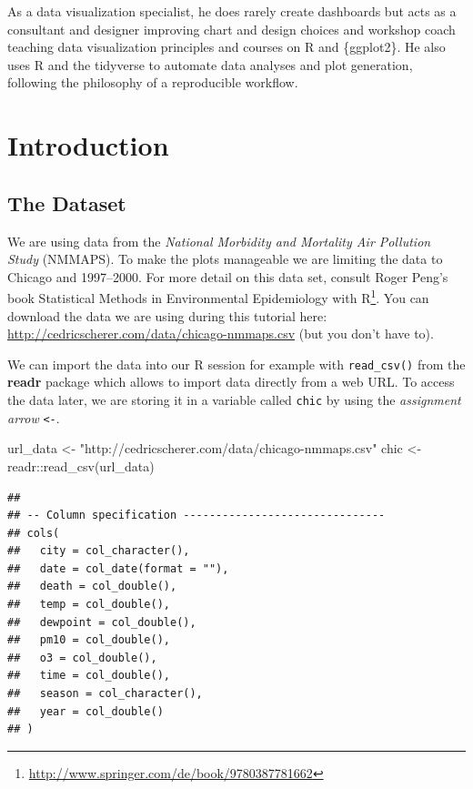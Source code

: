 \documentclass[
]{krantz}
\makeatletter
\newenvironment{Shaded}{\begin{snugshade}}{\end{snugshade}}
\newcommand{\FunctionTok}[1]{\textcolor[rgb]{0,0,0}{#1}}
\newcommand{\NormalTok}[1]{#1}
\newcommand{\OtherTok}[1]{\textcolor[rgb]{0.37,0.37,0.37}{#1}}
\newcommand{\SpecialCharTok}[1]{\textcolor[rgb]{0,0,0}{#1}}
\newcommand{\StringTok}[1]{\textcolor[rgb]{0.5,0.5,0.5}{#1}}
\renewcommand{\href}[2]{#2\footnote{\url{#1}}}
\newenvironment{kframe}{%
\medskip{}
\setlength{\fboxsep}{.8em}
 \def\at@end@of@kframe{}%
 \ifinner\ifhmode%
  \def\at@end@of@kframe{\end{minipage}}%
  \begin{minipage}{\columnwidth}%
 \fi\fi%
 \def\FrameCommand##1{\hskip\@totalleftmargin \hskip-\fboxsep
 \colorbox{shadecolor}{##1}\hskip-\fboxsep
     \hskip-\linewidth \hskip-\@totalleftmargin \hskip\columnwidth}%
 \MakeFramed {\advance\hsize-\width
   \@totalleftmargin\z@ \linewidth\hsize
   \@setminipage}}%
 {\par\unskip\endMakeFramed%
 \at@end@of@kframe}
\renewenvironment{Shaded}{\begin{kframe}}{\end{kframe}}
\makeatother
\begin{document}
As a data visualization specialist, he does rarely create dashboards but acts as a consultant and designer improving chart and design choices and workshop coach teaching data visualization principles and courses on R and \{ggplot2\}. He also uses R and the tidyverse to automate data analyses and plot generation, following the philosophy of a reproducible workflow.

\mainmatter

\hypertarget{introduction}{%
\chapter{Introduction}\label{introduction}}

\hypertarget{data}{%
\section{The Dataset}\label{data}}

We are using data from the \emph{National Morbidity and Mortality Air Pollution Study} (NMMAPS). To make the plots manageable we are limiting the data to Chicago and 1997--2000. For more detail on this data set, consult Roger Peng's book \href{http://www.springer.com/de/book/9780387781662}{Statistical Methods in Environmental Epidemiology with R}.
You can download the data we are using during this tutorial here: \url{http://cedricscherer.com/data/chicago-nmmaps.csv} (but you don't have to).

We can import the data into our R session for example with \texttt{read\_csv()} from the \textbf{readr} package which allows to import data directly from a web URL. To access the data later, we are storing it in a variable called \texttt{chic} by using the \emph{assignment arrow} \texttt{\textless{}-}.

\begin{Shaded}
\begin{Highlighting}[]
\NormalTok{url\_data }\OtherTok{\textless{}{-}} \StringTok{"http://cedricscherer.com/data/chicago{-}nmmaps.csv"}
\NormalTok{chic }\OtherTok{\textless{}{-}}\NormalTok{ readr}\SpecialCharTok{::}\FunctionTok{read\_csv}\NormalTok{(url\_data)}
\end{Highlighting}
\end{Shaded}

\begin{verbatim}
## 
## -- Column specification -------------------------------
## cols(
##   city = col_character(),
##   date = col_date(format = ""),
##   death = col_double(),
##   temp = col_double(),
##   dewpoint = col_double(),
##   pm10 = col_double(),
##   o3 = col_double(),
##   time = col_double(),
##   season = col_character(),
##   year = col_double()
## )
\end{verbatim}
\end{document}
